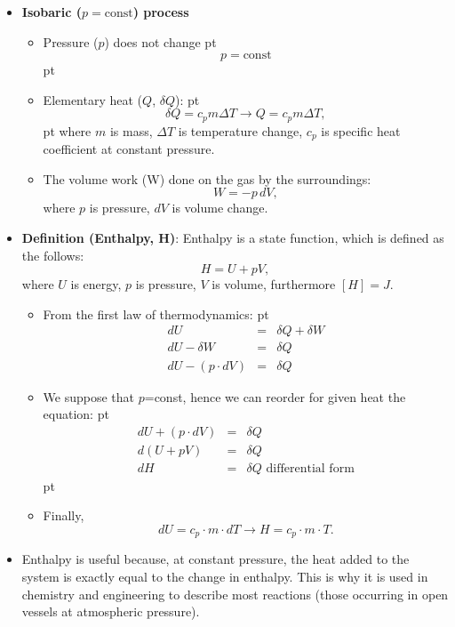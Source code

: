 \documentclass[t,aspectratio=169]{beamer}
\begin{document}
\begin{frame}
\begin{itemize}
\begin{itemize}
\item Internal energy:
 pt
\begin{eqnarray*}
U &=& c_V m T \\
\Delta U &=& c_{v} m \Delta T,
\end{eqnarray*}
 pt
where $m$ is mass, $\Delta T$ is temperature change, $c_{v}$ is specific heat coefficient at constant volume.
\end{itemize}

\pagebreak
\item \textbf{Isobaric  ($p = \text{const}$) process}
\begin{itemize}
\item Pressure ($p$) does not change
 pt
$$p = \text{const} $$
 pt
\item Elementary heat ($Q$, $\delta Q$):
 pt
$$ \delta Q = c_p m \Delta T \rightarrow Q = c_{p} m \Delta T,$$
 pt
where $m$ is mass, $\Delta T$ is temperature change, $c_{p}$ is specific heat coefficient at constant pressure.
\item The volume work (W) done on the gas by the surroundings:
  $$ W = -p\, dV, $$
where $p$ is pressure, $dV$ is volume change.
\end{itemize}

\pagebreak
\item \textbf{Definition (Enthalpy, H)}: Enthalpy is a state function, which is defined as the follows:
$$ H = U + pV,$$
where $U$ is energy, $p$ is pressure, $V$ is volume, furthermore $\left[H\right]=J$.
\begin{itemize}
\item From the first law of thermodynamics:
 pt
\begin{eqnarray*}
  dU &=& \delta Q + \delta W \\
  dU - \delta W &=& \delta Q \\
  dU - \left(p \cdot dV\right) &=& \delta Q
\end{eqnarray*}
\item We suppose that $p$=const, hence we can reorder for given heat the equation:
 pt
\begin{eqnarray*}
  dU + \left(p \cdot dV\right) &=& \delta Q \\
  d\left(U + pV\right) &=& \delta Q \\
  dH&=&\delta Q \text{\ \ differential form}
\end{eqnarray*}
 pt
\item Finally,
  $$dU=c_{p}\cdot m \cdot dT \rightarrow H=c_{p}\cdot m \cdot T.$$
\end{itemize}
\item Enthalpy is useful because, at constant pressure, the heat added to the system is exactly equal to the change in enthalpy. This is why it is used in chemistry and engineering to describe most reactions (those occurring in open vessels at atmospheric pressure).



\end{itemize}
\end{frame}
\end{document}
